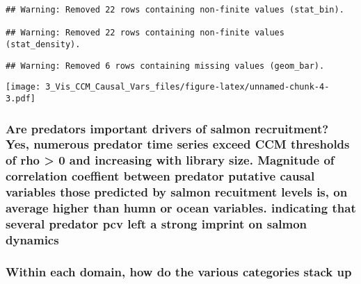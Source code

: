 \documentclass[
]{article}
\begin{document}
\begin{verbatim}
## Warning: Removed 22 rows containing non-finite values (stat_bin).

## Warning: Removed 22 rows containing non-finite values (stat_density).
\end{verbatim}

\begin{verbatim}
## Warning: Removed 6 rows containing missing values (geom_bar).
\end{verbatim}

\texttt{[image: 3\_Vis\_CCM\_Causal\_Vars\_files/figure-latex/unnamed-chunk-4-3.pdf]}

\hypertarget{are-predators-important-drivers-of-salmon-recruitment-yes-numerous-predator-time-series-exceed-ccm-thresholds-of-rho-0-and-increasing-with-library-size.-magnitude-of-correlation-coeffient-between-predator-putative-causal-variables-those-predicted-by-salmon-recuitment-levels-is-on-average-higher-than-humn-or-ocean-variables.-indicating-that-several-predator-pcv-left-a-strong-imprint-on-salmon-dynamics}{%
\subsubsection{Are predators important drivers of salmon recruitment?
Yes, numerous predator time series exceed CCM thresholds of rho
\textgreater{} 0 and increasing with library size. Magnitude of
correlation coeffient between predator putative causal variables those
predicted by salmon recuitment levels is, on average higher than humn or
ocean variables. indicating that several predator pcv left a strong
imprint on salmon
dynamics}\label{are-predators-important-drivers-of-salmon-recruitment-yes-numerous-predator-time-series-exceed-ccm-thresholds-of-rho-0-and-increasing-with-library-size.-magnitude-of-correlation-coeffient-between-predator-putative-causal-variables-those-predicted-by-salmon-recuitment-levels-is-on-average-higher-than-humn-or-ocean-variables.-indicating-that-several-predator-pcv-left-a-strong-imprint-on-salmon-dynamics}}

\hypertarget{within-each-domain-how-do-the-various-categories-stack-up}{%
\subsubsection{Within each domain, how do the various categories stack
up}\label{within-each-domain-how-do-the-various-categories-stack-up}}
\end{document}

